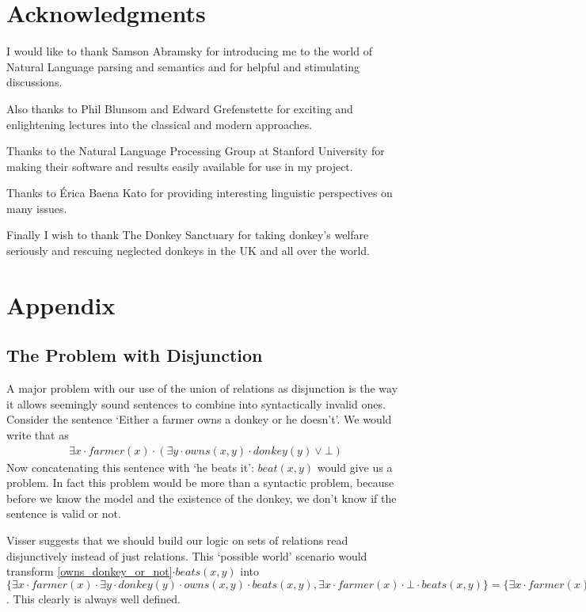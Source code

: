 \documentclass[12pt]{article}
\let\stdsection\section
\renewcommand\section{\newpage\stdsection}
\begin{document}
\section{Acknowledgments}
I would like to thank Samson Abramsky for introducing me to the world of Natural Language parsing and semantics and for helpful and stimulating discussions.

Also thanks to Phil Blunsom and Edward Grefenstette for exciting and enlightening lectures into the classical and modern approaches.

Thanks to the Natural Language Processing Group at Stanford University for making their software and results easily available for use in my project\cite{klein2003accurate}.

Thanks to Érica Baena Kato for providing interesting linguistic perspectives on many issues.

Finally I wish to thank The Donkey Sanctuary\cite{donkey2013sanctuary} for taking donkey's welfare seriously and rescuing neglected donkeys in the UK and all over the world.

\newpage
\section{Appendix}


\subsection{The Problem with Disjunction}\label{sec:problem_disj}


A major problem with our use of the union of relations as disjunction is the way it allows seemingly sound sentences to combine into syntactically invalid ones. Consider the sentence `Either a farmer owns a donkey or he doesn't'. We would write that as
\begin{align}
\exists x\cdot farmer(x)\cdot(\exists y\cdot owns(x,y)\cdot donkey(y)\vee \bot) \label{owns_donkey_or_not}
\end{align}
Now concatenating this sentence with `he beats it': $beat(x,y)$ would give us a problem. In fact this problem would be more than a syntactic problem, because before we know the model and the existence of the donkey, we don't know if the sentence is valid or not.

Visser\cite{visser1999donkey} suggests that we should build our logic on sets of relations read disjunctively instead of just relations. This `possible world' scenario would transform \eqref{owns_donkey_or_not}$\cdot beats(x,y)$ into $\{\exists x\cdot farmer(x)\cdot\exists y\cdot donkey(y)\cdot owns(x,y)\cdot beats(x,y), \exists x\cdot farmer(x)\cdot\bot\cdot beats(x,y)\} = \{\exists x\cdot farmer(x)\cdot\exists y\cdot donkey(y)\cdot owns(x,y)\cdot beats(x,y), \bot\}$. This clearly is always well defined.
\end{document}
